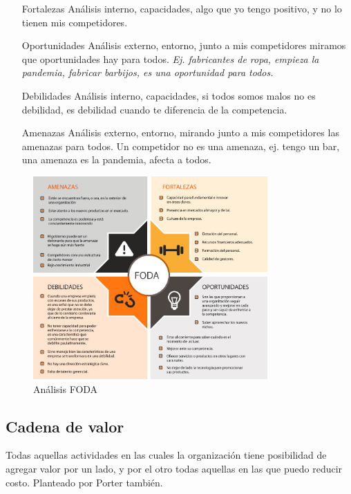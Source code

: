 \documentclass[titlepage,a4paper]{article}
\begin{document}
\begin{itemize}
    \item[Fortalezas] Análisis interno, capacidades, algo que yo tengo positivo, y no lo tienen mis competidores. 
    \item[Oportunidades] Análisis externo, entorno, junto a mis competidores miramos que oportunidades hay para todos. \textit{Ej. fabricantes de ropa, empieza la pandemia, fabricar barbijos, es una oportunidad para todos.}
    \item[Debilidades] Análisis interno, capacidades, si todos somos malos no es debilidad, es debilidad cuando te diferencia de la competencia.
    \item[Amenazas] Análisis externo, entorno, mirando junto a mis competidores las amenazas para todos. Un competidor no es una amenaza, ej. tengo un bar, una amenaza es la pandemia, afecta a todos.
\end{itemize}

\begin{figure}[!htb]
    \centering
    \includegraphics[width=0.8\textwidth]{imagenes/Analisis-Foda.jpg}
    \caption{Análisis FODA}
\end{figure}

\newpage 

\subsection{Cadena de valor}
Todas aquellas actividades en las cuales la organización tiene posibilidad de agregar valor por un lado, y por el otro todas aquellas en las que puedo reducir costo. Planteado por Porter también.
\end{document}
